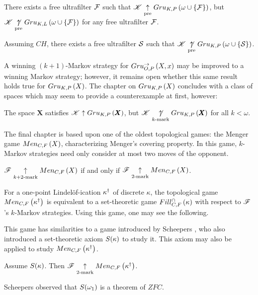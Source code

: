 \begin{thm*}
  There exists a free ultrafilter $\mathcal{F}$ such that
  $\mathscr{K} \underset{\text{pre}}{\uparrow}Gru_{K,P}\left({\omega\cup\{\mathcal{F}\}}\right)$, but
  $\mathscr{K} \underset{\text{pre}}{\not\uparrow}Gru_{K,L}\left({\omega\cup\{\mathcal{F}\}}\right)$ for any free
  ultrafilter $\mathcal{F}$.
\end{thm*}
\begin{thm*}
  Assuming $CH$, there exists a free ultrafilter $\mathcal{S}$ such that
  $\mathscr{K} \underset{\text{pre}}{\not\uparrow}Gru_{K,P}\left({\omega\cup\{\mathcal{S}\}}\right)$.
\end{thm*}

A winning $(k+1)$-Markov strategy for $Gru_{O,P}^{\to}\left({X},{x}\right)$ may be improved to
a winning Markov strategy; however, it remains open whether this same
result holds true for $Gru_{K,P}\left({X}\right)$. The chapter on $Gru_{K,P}\left({X}\right)$ concludes
with a class of spaces which may seem to provide a counterexample at first,
however:

\begin{thm*}
  The space $\pmb X$ satisfies $\mathscr{K}\uparrow Gru_{K,P}\left({\pmb X}\right)$, but
  $\mathscr{K}\underset{k\text{-mark}}{\not\uparrow}Gru_{K,P}\left({\pmb X}\right)$ for all $k<\omega$.
\end{thm*}

The final chapter is based upon one of the oldest topological games:
the Menger game $Men_{C,F}\left({X}\right)$, characterizing Menger's covering property.
In this game, $k$-Markov strategies need only consider at most
two moves of the opponent.

\begin{thm*}
  $\mathscr{F}\underset{k+2\text{-mark}}{\uparrow}Men_{C,F}\left({X}\right)$ if and only if
  $\mathscr{F}\underset{2\text{-mark}}{\uparrow}Men_{C,F}\left({X}\right)$.
\end{thm*}

For a one-point Lindel\"of-ication $\kappa^\dagger$ of discrete $\kappa$,
the topological game $Men_{C,F}\left({\kappa^\dagger}\right)$ is equivalent to a
set-theoretic game $Fill^{\cap}_{C,F}\left({\kappa}\right)$ with respect to $\mathscr{F}$'s $k$-Markov
strategies. Using this game, one may see the following.

This game has similarities to a game introduced by
Scheepers \cite{MR1129143}, who also introduced a set-theoretic axiom
$S(\kappa)$ to study it. This axiom may also be applied to study
$Men_{C,F}\left({\kappa^\dagger}\right)$.

\begin{thm*}
  Assume $S(\kappa)$. Then
  $\mathscr{F}\underset{2\text{-mark}}{\uparrow}Men_{C,F}\left({\kappa^\dagger}\right)$.
\end{thm*}

Scheepers observed that $S(\omega_1)$ is a theorem of $ZFC$.

